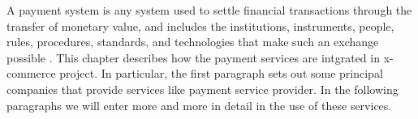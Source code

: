 A payment system is any system used to settle financial transactions through the transfer of monetary value, and includes the institutions, instruments, people, rules, procedures, standards, and technologies that make such an exchange possible \cite{payment_system_wiki}.
\newline
This chapter describes how the payment services are intgrated in x-commerce project. In particular, the first paragraph sets out some principal companies that provide services like payment service provider. In the following paragraphs we will enter more and more in detail in the use of these services.